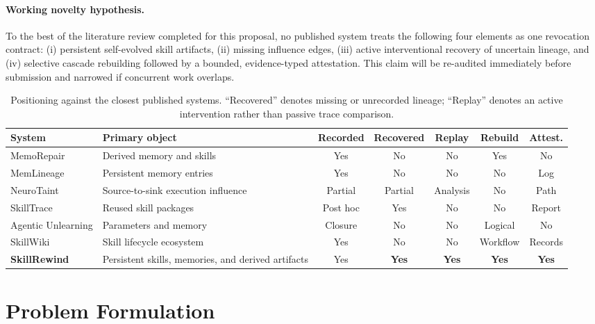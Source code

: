 \documentclass[11pt]{article}
\begin{document}
\paragraph{Working novelty hypothesis.}
To the best of the literature review completed for this proposal, no published system treats the following four elements as one revocation contract: (i) persistent self-evolved skill artifacts, (ii) missing influence edges, (iii) active interventional recovery of uncertain lineage, and (iv) selective cascade rebuilding followed by a bounded, evidence-typed attestation. This claim will be re-audited immediately before submission and narrowed if concurrent work overlaps.

\begin{table}[t]
\centering
\small
\caption{Positioning against the closest published systems. ``Recovered'' denotes missing or unrecorded lineage; ``Replay'' denotes an active intervention rather than passive trace comparison.}
\label{tab:landscape}
\begin{tabularx}{\linewidth}{@{}l>{\raggedright\arraybackslash}Xccccc@{}}
\toprule
System & Primary object & Recorded & Recovered & Replay & Rebuild & Attest. \\
\midrule
MemoRepair & Derived memory and skills & Yes & No & No & Yes & No \\
MemLineage & Persistent memory entries & Yes & No & No & No & Log \\
NeuroTaint & Source-to-sink execution influence & Partial & Partial & Analysis & No & Path \\
SkillTrace & Reused skill packages & Post hoc & Yes & No & No & Report \\
Agentic Unlearning & Parameters and memory & Closure & No & No & Logical & No \\
SkillWiki & Skill lifecycle ecosystem & Yes & No & No & Workflow & Records \\
\textbf{SkillRewind} & Persistent skills, memories, and derived artifacts & Yes & \textbf{Yes} & \textbf{Yes} & \textbf{Yes} & \textbf{Yes} \\
\bottomrule
\end{tabularx}
\end{table}

\section{Problem Formulation}
\end{document}
